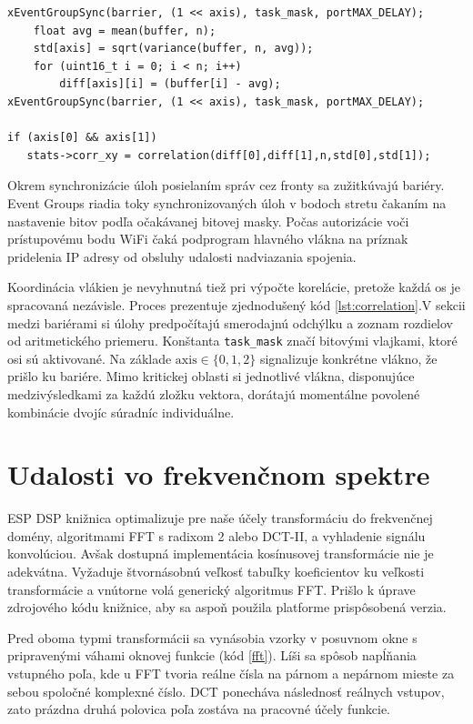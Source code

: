 \begin{lstlisting}[style=cstyle,caption=Synchronizácia úloh na výpočet korelácie osí,label={lst:correlation},
morekeywords={xEventGroupSync}]
xEventGroupSync(barrier, (1 << axis), task_mask, portMAX_DELAY);
	float avg = mean(buffer, n);
	std[axis] = sqrt(variance(buffer, n, avg));
	for (uint16_t i = 0; i < n; i++)
		diff[axis][i] = (buffer[i] - avg);
xEventGroupSync(barrier, (1 << axis), task_mask, portMAX_DELAY);

if (axis[0] && axis[1])
   stats->corr_xy = correlation(diff[0],diff[1],n,std[0],std[1]);
\end{lstlisting}

Okrem synchronizácie úloh posielaním správ cez fronty sa zužitkúvajú bariéry. Event Groups riadia toky
synchronizovaných úloh v bodoch stretu čakaním na nastavenie bitov podľa očakávanej bitovej masky. Počas
autorizácie voči prístupovému bodu WiFi čaká podprogram hlavného vlákna na príznak pridelenia IP adresy
od obsluhy udalosti nadviazania spojenia.

Koordinácia vlákien je nevyhnutná tiež pri výpočte korelácie, pretože každá os je spracovaná nezávisle. Proces
prezentuje zjednodušený kód \ref{lst:correlation}.V sekcii medzi bariérami si úlohy predpočítajú smerodajnú odchýlku a zoznam rozdielov
od aritmetického priemeru. Konštanta \verb|task_mask| značí bitovými vlajkami, ktoré osi sú aktivované.
Na základe $\mathrm{axis} \in \{0,1,2\}$ signalizuje konkrétne vlákno, že prišlo ku bariére. Mimo kritickej oblasti
si jednotlivé vlákna, disponujúce medzivýsledkami za každú zložku vektora, dorátajú momentálne povolené
kombinácie dvojíc súradníc individuálne.

\section{Udalosti vo frekvenčnom spektre}
ESP DSP knižnica optimalizuje pre naše účely transformáciu do frekvenčnej domény, algoritmami FFT s radixom 2 alebo DCT-II,
a vyhladenie signálu konvolúciou. Avšak dostupná implementácia kosínusovej transformácie nie je adekvátna.
Vyžaduje štvornásobnú veľkosť tabuľky koeficientov ku veľkosti transformácie a vnútorne volá generický
algoritmus FFT. Prišlo k úprave zdrojového kódu knižnice, aby sa aspoň použila platforme prispôsobená verzia.

Pred oboma typmi transformácii sa vynásobia vzorky v posuvnom okne s pripravenými váhami oknovej funkcie (kód \ref{fft}).
Líši sa spôsob napĺňania vstupného poľa, kde u FFT tvoria reálne čísla na párnom a nepárnom mieste za sebou
spoločné komplexné číslo. DCT ponecháva následnosť reálnych vstupov, zato prázdna druhá polovica poľa zostáva
na pracovné účely funkcie.

